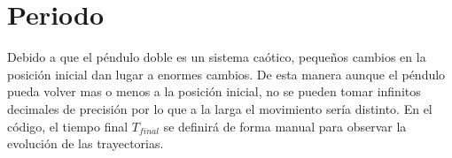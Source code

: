 \documentclass[11pt]{article}
\begin{document}
	\section{Periodo}
	Debido a que el péndulo doble es un sistema caótico, pequeños cambios en la posición inicial dan lugar a enormes cambios. De esta manera aunque el péndulo pueda volver mas o menos a la posición inicial, no se pueden tomar infinitos decimales de precisión por lo que a la larga el movimiento sería distinto. En el código, el tiempo final $T_{final}$ se definirá de forma manual para observar la evolución de las trayectorias.
	
\end{document}
